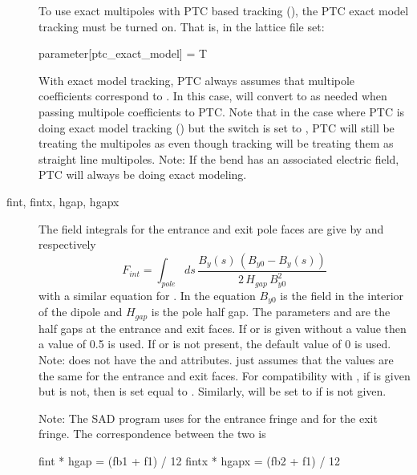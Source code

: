 \begin{description}
To use exact multipoles with PTC based tracking (), the PTC exact model
tracking must be turned on. That is, in the lattice file set:
\begin{example}
  parameter[ptc_exact_model] = T
\end{example}
With exact model tracking, PTC always assumes that multipole coefficients correspond to
. In this case, \bmad will convert  to
 as needed when passing multipole coefficients to PTC. Note that in
the case where PTC is doing exact model tracking () but the
 switch is set to , PTC will still be treating the multipoles
as  even though \bmad tracking will be treating them as straight
line multipoles. Note: If the bend has an associated electric field, PTC will always be
doing exact modeling.
  \item[fint, fintx, \Newline hgap, hgapx] \Newline
The field integrals for the entrance and
exit pole faces are give by  and  respectively
\begin{equation}
  F_{int} = \int_{pole} \! \! ds \, \frac{B_y(s) \, (B_{y0} - B_y(s))}
  {2 \, H_{gap} \, B_{y0}^2}
  \label{fsbbb}
\end{equation}
with a similar equation for . In the equation $B_{y0}$ is the field in the
interior of the dipole and $H_{gap}$ is the pole half gap.  The parameters  and
 are the half gaps at the entrance and exit faces. If  or  is
given without a value then a value of 0.5 is used. If  or  is not
present, the default value of 0 is used. Note: \mad does not have the  and
 attributes. \mad just assumes that the values are the same for the entrance and
exit faces. For compatibility with \mad, if  is given but  is not, then
 is set equal to . Similarly,  will be set to  if
 is not given.

Note: The SAD program uses  for the entrance fringe and  for the exit
fringe. The correspondence between the two is
\begin{example}
  fint  * hgap  = (fb1 + f1) / 12
  fintx * hgapx = (fb2 + f1) / 12
\end{example}


\end{description}
